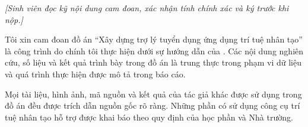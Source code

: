 \begin{declaration}

\textit{[Sinh viên đọc kỹ nội dung cam đoan, xác nhận tính chính xác và ký trước khi nộp.]}

Tôi xin cam đoan đồ án ``Xây dựng trợ lý tuyển dụng ứng dụng trí tuệ nhân tạo'' là công trình do chính tôi thực hiện dưới sự hướng dẫn của \dauGVHD. Các nội dung nghiên cứu, số liệu và kết quả trình bày trong đồ án là trung thực trong phạm vi dữ liệu và quá trình thực hiện được mô tả trong báo cáo.

Mọi tài liệu, hình ảnh, mã nguồn và kết quả của tác giả khác được sử dụng trong đồ án đều được trích dẫn nguồn gốc rõ ràng. Những phần có sử dụng công cụ trí tuệ nhân tạo hỗ trợ được khai báo theo quy định của học phần và Nhà trường.

\vspace{1.4em}
\hfill{}

\end{declaration}
